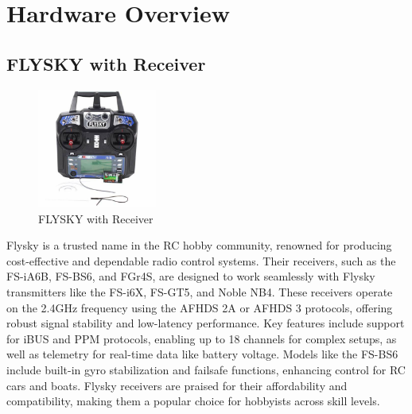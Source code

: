 \section{Hardware Overview}
\subsection{FLYSKY with Receiver}
\begin{figure}[H]
\centering
\includegraphics[width=0.35\textwidth]{images/flysky with receiver.jpg}
\caption{FLYSKY with Receiver}
\end{figure}
Flysky is a trusted name in the RC hobby community, renowned for producing cost-effective and dependable radio control systems. Their receivers, such as the FS-iA6B, FS-BS6, and FGr4S, are designed to work seamlessly with Flysky transmitters like the FS-i6X, FS-GT5, and Noble NB4. These receivers operate on the 2.4GHz frequency using the AFHDS 2A or AFHDS 3 protocols, offering robust signal stability and low-latency performance. Key features include support for iBUS and PPM protocols, enabling up to 18 channels for complex setups, as well as telemetry for real-time data like battery voltage. Models like the FS-BS6 include built-in gyro stabilization and failsafe functions, enhancing control for RC cars and boats. Flysky receivers are praised for their affordability and compatibility, making them a popular choice for hobbyists across skill levels.


